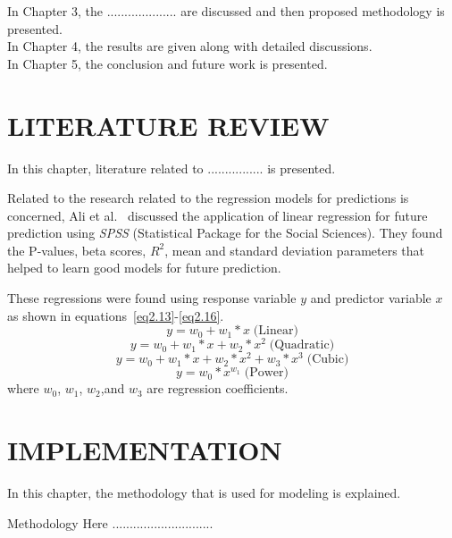 \documentclass[12pt,a4paper,oneside]{book} %
\begin{document}
In Chapter 3, the .................... are discussed and then proposed methodology is presented. \\

In Chapter 4, the results are given along with detailed discussions. \\

In Chapter 5, the conclusion and future work is presented.

\chapter{LITERATURE REVIEW}\label{c-work}

In this chapter, literature related to ................ is presented.

Related to the \cite{umair} research related to the regression models for predictions is concerned, Ali et al.~\cite{ali} discussed the application of linear regression for future prediction using {\it SPSS} (Statistical Package for the Social Sciences). They found the P-values, beta scores, $R^2$, mean and standard deviation parameters that helped to learn good models for future prediction.

These regressions were found using response variable $y$ and predictor variable $x$ as shown in equations~\ref{eq2.13}-\ref{eq2.16}.
%
\begin{equation}
  y  =  w_0 + w_1 * x \; \mbox{(Linear)}
  \label{eq2.13}
\end{equation}
%
\begin{equation}
  y = w_0 + w_1 * x + w_2 * x^2 \; \mbox{(Quadratic)}
  \label{eq2.14}
\end{equation}
%
\begin{equation}
  y = w_0 + w_1 * x + w_2 * x^2 + w_3 * x^3 \; \mbox{(Cubic)}
  \label{eq2.15}
\end{equation}
%
\begin{equation}
  y = w_0 * x^{w_1} \; \mbox{(Power)}
  \label{eq2.16}
\end{equation}
%
\noindent where $w_0$, $w_1$, $w_2$,and $w_3$ are regression coefficients.

\chapter{IMPLEMENTATION}\label{c-implement}
In this chapter, the methodology that is used for modeling is explained.

Methodology Here .............................
\end{document}
